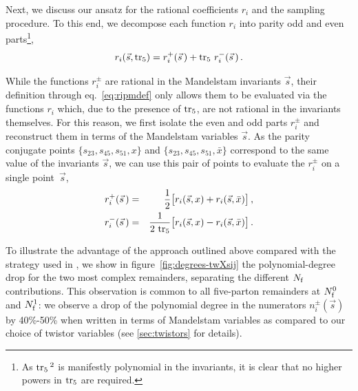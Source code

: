 Next, we discuss our ansatz for the rational coefficients $r_i$ and the sampling procedure.
To this end, we decompose each function $r_i$ into parity odd and even parts\footnote{
  As $\operatorname{tr_5}{}^2$ is manifestly polynomial in the invariants, it is clear that
  no higher powers in $\operatorname{tr_5}$ are required. 
},
\begin{equation}
    \label{eq:ripmdef}
		 r_i(\vec s, \operatorname{tr_5} ) = r_i^+(\vec s\,)  + \operatorname{tr_5} \, r_i^-(\vec s\,)\,. 
\end{equation}
%

While the functions $r_i^{\pm}$  are rational in the Mandelstam 
invariants $\vec s$, their
definition through eq.~\eqref{eq:ripmdef} only allows them to be
evaluated via the functions $r_i$ which, due to the presence of
$\operatorname{tr_5}$, are not rational in the invariants themselves. 
For this reason, we first isolate the even and odd parts $r_i^\pm$
and reconstruct them in terms of the Mandelstam variables $\vec s$.
As the parity conjugate points $\{s_{23},s_{45},s_{51}, x\}$
and $\{s_{23},s_{45},s_{51}, \bar x\}$ 
correspond to  the same  value of the invariants $\vec s$, we can use
this pair of points to evaluate the $r_i^{\pm}$ on a single point~$\vec s$,
\begin{eqnarray}
		r^+_i(\vec s\, ) &=& \frac{1}{2} \big[ r_i(\vec s, x ) + r_i(\vec s,\bar x ) \big]\,,\\
		r^-_i(\vec s\, ) &=& \frac{1}{2\, \operatorname{tr_5} } \big[ r_i(\vec s,x ) - r_i(\vec s,\bar x ) \big]\,.
\end{eqnarray}



To illustrate the advantage of the approach outlined above compared with the
strategy used in \cite{Abreu:2018zmy}, we show in
figure~\ref{fig:degrees-twXsij}  the polynomial-degree drop for the
two most complex remainders, separating the different $N_\mathrm{f}$ contributions.
This observation is common to all five-parton remainders at $N_\mathrm{f}^0$ and $N_\mathrm{f}^1$: 
we observe a drop of the polynomial degree in the numerators  $n_i^\pm(\vec s)$ by 
40\%-50\% when written in terms of Mandelstam variables as compared to our choice of twistor 
variables (see \cref{sec:twistors} for details).

